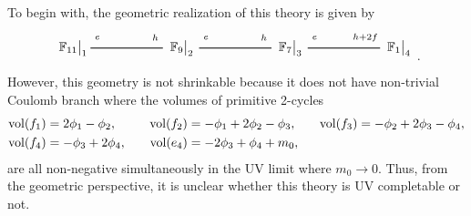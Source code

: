 To begin with, the geometric realization of this theory is given by 
\begin{align}\label{eq:su5_8}
\begin{tikzpicture}
\draw (0, 0) node {$ \eval{\mathbb{F}_{11}}_1 $}
(3, 0) node {$ \eval{\mathbb{F}_9}_2 $}
(6, 0) node {$ \eval{\mathbb{F}_7}_3 $}
(9, 0) node {$ \eval{\mathbb{F}_1}_4 $};
\draw [thick](0.5, 0) -- (2.5, 0)
(3.5, 0) -- (5.5, 0)
(6.5, 0) -- (8.5, 0);
\draw (0.7, 0.3) node {$ _{e} $}
(2.3, 0.3) node {$ _{h} $}
(3.7, 0.3) node {$ _e $}
(5.3, 0.3) node {$ _h $}
(6.7, 0.3) node {$ _{e} $}
(8.1, 0.3) node {$ _{h+2f} $}
;
\end{tikzpicture} \, .
\end{align}
However, this geometry is not shrinkable because it does not have  non-trivial Coulomb branch where the volumes of primitive 2-cycles 
\begin{align}\label{eq:su5_8_vol}
\operatorname{vol} (f_1) & = 2\phi_1 - \phi_2, \quad
&\operatorname{vol} (f_2) &= -\phi_1 + 2\phi_2 - \phi_3, \quad
&\operatorname{vol} (f_3) &= -\phi_2 + 2\phi_3 - \phi_4, \nonumber \\
\operatorname{vol} (f_4) &= -\phi_3 + 2\phi_4, \quad
&\operatorname{vol} (e_4) &= -2\phi_3 + \phi_4 + m_0,&&
\end{align}
are all non-negative simultaneously in the UV limit where $ m_0 \to 0 $. Thus, from the geometric perspective, it is unclear whether this theory is UV completable or not.


